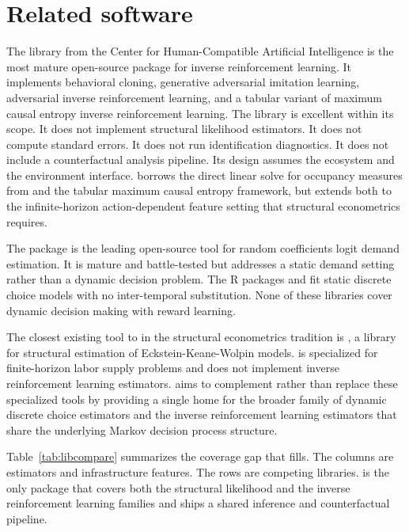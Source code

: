 \section{Related software} \label{sec:related}

The  library \citep{gleave2022imitation} from the Center for Human-Compatible Artificial Intelligence is the most mature open-source package for inverse reinforcement learning. It implements behavioral cloning, generative adversarial imitation learning, adversarial inverse reinforcement learning, and a tabular variant of maximum causal entropy inverse reinforcement learning. The library is excellent within its scope. It does not implement structural likelihood estimators. It does not compute standard errors. It does not run identification diagnostics. It does not include a counterfactual analysis pipeline. Its design assumes the  ecosystem and the  environment interface.  borrows the direct linear solve for occupancy measures from  and the tabular maximum causal entropy framework, but extends both to the infinite-horizon action-dependent feature setting that structural econometrics requires.

The  package \citep{conlon2020pyblp} is the leading open-source tool for random coefficients logit demand estimation. It is mature and battle-tested but addresses a static demand setting rather than a dynamic decision problem. The R packages  and  fit static discrete choice models with no inter-temporal substitution. None of these libraries cover dynamic decision making with reward learning.

The closest existing tool to  in the structural econometrics tradition is  \citep{respy2020}, a  library for structural estimation of Eckstein-Keane-Wolpin models.  is specialized for finite-horizon labor supply problems and does not implement inverse reinforcement learning estimators.  aims to complement rather than replace these specialized tools by providing a single home for the broader family of dynamic discrete choice estimators and the inverse reinforcement learning estimators that share the underlying Markov decision process structure.

Table~\ref{tab:libcompare} summarizes the coverage gap that  fills. The columns are estimators and infrastructure features. The rows are competing libraries.  is the only package that covers both the structural likelihood and the inverse reinforcement learning families and ships a shared inference and counterfactual pipeline.

